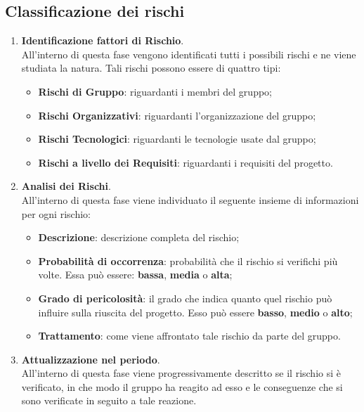 \subsection{Classificazione dei rischi}

\begin{enumerate}
		
\item \textbf{Identificazione fattori di Rischio}. \\ 
	  All'interno di questa fase vengono identificati tutti i possibili rischi e ne viene studiata la natura. Tali rischi possono essere di quattro tipi:
	\begin{itemize}
	\item \textbf{Rischi di Gruppo}: riguardanti i membri del gruppo; 
	\item \textbf{Rischi Organizzativi}: riguardanti l'organizzazione del gruppo;
	\item \textbf{Rischi Tecnologici}: riguardanti le tecnologie usate dal gruppo;
	\item \textbf{Rischi a livello dei Requisiti}: riguardanti i requisiti del progetto.
	\end{itemize}
				
\item \textbf{Analisi dei Rischi}. \\
	  All'interno di questa fase viene individuato il seguente insieme di informazioni per ogni rischio: 
	\begin{itemize}
	\item \textbf{Descrizione}: descrizione completa del rischio;
	\item \textbf{Probabilità di occorrenza}: probabilità che il rischio si verifichi più volte. Essa può essere: \textbf{bassa}, \textbf{media} o \textbf{alta};
	\item \textbf{Grado di pericolosità}: il grado che indica quanto quel rischio può influire sulla riuscita del progetto. Esso può essere \textbf{basso}, \textbf{medio} o \textbf{alto};
	\item \textbf{Trattamento}: come viene affrontato tale rischio da parte del gruppo.	
	\end{itemize}

\item \textbf{Attualizzazione nel periodo}. \\
	  All'interno di questa fase viene progressivamente descritto se il rischio si è verificato, in che modo il gruppo ha reagito ad esso e le conseguenze che si sono verificate in seguito a tale reazione.

\end{enumerate}

